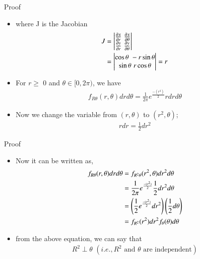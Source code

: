 \documentclass{beamer}
\begin{document}
\begin{frame}{Proof}
  \begin{itemize} 
  \item where J is the Jacobian 
  \begin{align}
  	J &= \begin{vmatrix}\frac{\partial x}{\partial r} \,\, \frac{\partial x}{\partial \theta}\\\frac{\partial y}{\partial r} \,\, \frac{\partial y}{\partial \theta}\end{vmatrix}\\
  	&= \begin{vmatrix}\cos\theta \,\, -r\sin\theta \\ \sin\theta \,\, r\cos\theta\end{vmatrix} = r
  \end{align}
  \item For $r\ge$ 0 and $\theta \in [0,2\pi)$, we have 
  \begin{align}
  	f_{R\theta}(r,\theta) drd\theta = \frac{1}{2\pi}e^{\frac{-(r^2)}{2}}rdrd\theta
  \end{align}
  \item Now we change the variable from $(r,\theta)$ to $(r^2,\theta)$;
  \begin{align}
  	rdr = \frac{1}{2}dr^2
  \end{align}
  \end{itemize}
\end{frame}

\begin{frame}{Proof}
  \begin{itemize} 
  \item Now it can be written as, 
  \begin{align}
  	f_{R\theta}(r,\theta)drd\theta &= f_{R^2\theta}(r^2,\theta)dr^2d\theta\\
  	&= \frac{1}{2\pi}e^{\frac{-(r^2)}{2}}\frac{1}{2}dr^2d\theta\\
  	&= \left(\frac{1}{2}e^{\frac{-(r^2)}{2}}dr^2\right)\left(\frac{1}{2}d\theta\right)\\
  	&= f_{R^2}(r^2)dr^2 f_{\theta}(\theta)d\theta
  \end{align}
  \item from the above equation, we can say that 
  \begin{align}
        R^2\perp\theta \,\, (i.e., R^2 \text{ and } \theta \text{ are independent})
  \end{align}
  \end{itemize}
\end{frame}
\end{document}
